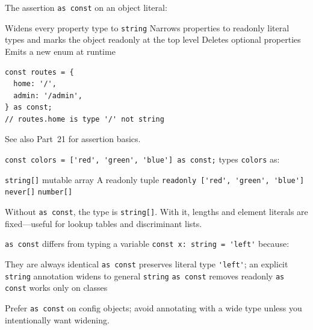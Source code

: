 \question[4]
The assertion \lstinline[style=tsinline]|as const| on an object literal:
\begin{choices}
  \choice Widens every property type to \lstinline[style=tsinline]|string|
  \CorrectChoice Narrows properties to readonly literal types and marks the object readonly at the top level
  \choice Deletes optional properties
  \choice Emits a new enum at runtime
\end{choices}
\begin{solution}
\begin{lstlisting}[style=ts]
const routes = {
  home: '/',
  admin: '/admin',
} as const;
// routes.home is type '/' not string
\end{lstlisting}
  See also Part~21 for assertion basics.
\end{solution}

\question[4]
\lstinline[style=tsinline]|const colors = ['red', 'green', 'blue'] as const;| types \lstinline[style=tsinline]|colors| as:
\begin{choices}
  \choice \lstinline[style=tsinline]|string[]| mutable array
  \CorrectChoice A readonly tuple \lstinline[style=tsinline]|readonly ['red', 'green', 'blue']|
  \choice \lstinline[style=tsinline]|never[]|
  \choice \lstinline[style=tsinline]|number[]|
\end{choices}
\begin{solution}
  Without \lstinline[style=tsinline]|as const|, the type is \lstinline[style=tsinline]|string[]|. With it, lengths and element literals are fixed---useful for lookup tables and discriminant lists.
\end{solution}

\question[4]
\lstinline[style=tsinline]|as const| differs from typing a variable \lstinline[style=tsinline]|const x: string = 'left'| because:
\begin{choices}
  \choice They are always identical
  \CorrectChoice \lstinline[style=tsinline]|as const| preserves literal type \lstinline[style=tsinline]|'left'|; an explicit \lstinline[style=tsinline]|string| annotation widens to general \lstinline[style=tsinline]|string|
  \choice \lstinline[style=tsinline]|as const| removes readonly
  \choice \lstinline[style=tsinline]|as const| works only on classes
\end{choices}
\begin{solution}
  Prefer \lstinline[style=tsinline]|as const| on config objects; avoid annotating with a wide type unless you intentionally want widening.
\end{solution}

